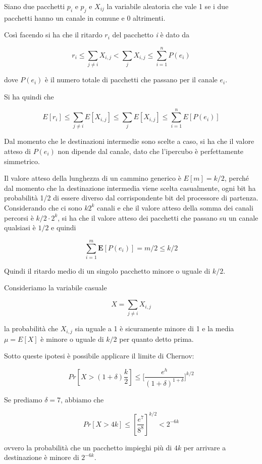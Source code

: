 Siano due pacchetti $p_i$ e $p_j$ e $X_{ij}$ la variabile aleatoria che vale 1 se i due pacchetti hanno un canale in comune e 0 altrimenti.

Così facendo si ha che il ritardo $r_i$ del pacchetto \emph{i} è dato da

$$
r_i \leq \sum\limits_{j \neq i} X_{i,j} < \sum\limits_{j} X_{i,j} \leq \sum\limits_{i = 1}^{n} P(e_i)
$$

dove $P(e_i)$ è il numero totale di pacchetti che passano per il canale $e_i$.

Si ha quindi che

$$
E[r_i] \leq \sum\limits_{j \neq i} E[X_{i,j}] \leq \sum\limits_{j} E[X_{i,j}] \leq \sum\limits_{i = 1}^{n} E[P(e_i)]
$$

Dal momento che le destinazioni intermedie sono scelte a caso, si ha che il valore atteso di $P(e_i)$ non dipende dal canale, dato che l'ipercubo è perfettamente simmetrico.

Il valore atteso della lunghezza di un cammino generico è $E[m] = k/2$, perché dal momento che la destinazione intermedia viene scelta casualmente, ogni bit ha probabilità 1/2 di essere diverso dal corrispondente bit del processore di partenza. 
Considerando che ci sono $k 2^k$ canali e che il valore atteso della somma dei canali percorsi è $k/2 \cdot  2^{k}$, si ha che il valore atteso dei pacchetti che passano su un canale qualsiasi è $1/2$ e quindi

$$
\sum\limits_{i = 1}^{m} \textbf{E}[P(e_i)] = m/2 \leq k/2
$$

Quindi il ritardo medio di un singolo pacchetto minore o uguale di $k/2$.

Consideriamo la variabile casuale

$$
X = \sum\limits_{j \neq i} X_{i,j}
$$

la probabilità che $X_{i,j}$ sia uguale a 1 è sicuramente minore di 1 e la media $\mu =E[X]$ è minore o uguale di $k/2$ per quanto detto prima.

Sotto queste ipotesi è possibile applicare il limite di Chernov:

$$
Pr[X > (1 + \delta)\frac{k}{2}] \leq \Big[ \frac{e^h}{(1+\delta)^{1+\delta}} \big]^{k/2}
$$

Se prediamo $\delta = 7$, abbiamo che

$$
Pr[X > 4k] \leq  [\frac{e^7}{8^8}]^{k/2} < 2^{-6k}
$$

ovvero la probabilità che un pacchetto impieghi più di $4k$ per arrivare a destinazione è minore di $2^{-6k}$.

